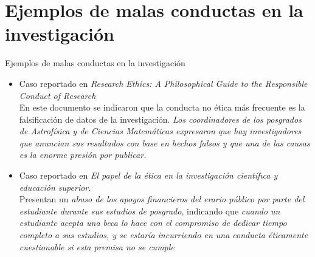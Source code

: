 \section{Ejemplos de malas conductas en la investigación}
\begin{frame}{Ejemplos de malas conductas en la investigación}
    \changefontsizes{10pt}
    \begin{itemize}
        \item Caso reportado en \textit{Research Ethics: A Philosophical Guide to the Responsible Conduct of Research}\\
        En este documento se indicaron que la conducta no ética más frecuente es la falsificación de datos de la investigación.
        \textit{Los coordinadores de los posgrados de Astrofísica y de Ciencias Matemáticas expresaron
        que hay investigadores que anuncian sus resultados con base en hechos falsos y que una de las
        causas es la enorme presión por publicar.}
        \item Caso reportado en \textit{El papel de la ética en la investigación científıca y educación superior.}\\
        Presentan un \textit{abuso de los apoyos financieros del
        erario público por parte del estudiante durante sus estudios de posgrado}, indicando que \textit{
            cuando un estudiante acepta una beca lo hace con el compromiso de dedicar tiempo completo a sus
    estudios, y se estaría incurriendo en una conducta éticamente cuestionable si esta premisa no
    se cumple}
    \end{itemize}
\end{frame}
